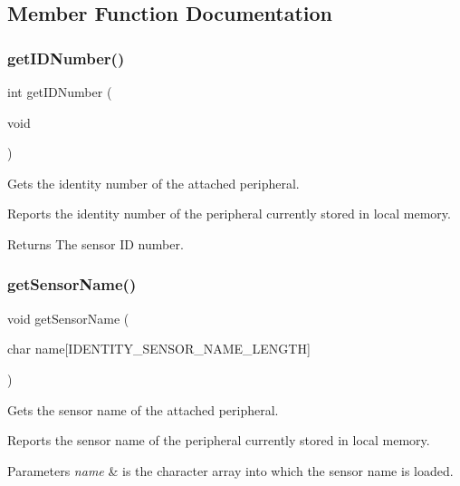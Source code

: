 \subsection{Member Function Documentation}
\mbox{\label{class_identifiable_a85d8439d79bd15eeb1c40d694d3d49ae}} 
\subsubsection{\texorpdfstring{getIDNumber()}{getIDNumber()}}
{\footnotesize\ttfamily int get\+I\+D\+Number (\begin{DoxyParamCaption}\item[{void}]{ }\end{DoxyParamCaption})}



Gets the identity number of the attached peripheral. 

Reports the identity number of the peripheral currently stored in local memory. \begin{DoxyReturn}{Returns}
The sensor ID number. 
\end{DoxyReturn}
\mbox{\label{class_identifiable_a7942e337c1303ce42cc822032465c66a}} 
\subsubsection{\texorpdfstring{getSensorName()}{getSensorName()}}
{\footnotesize\ttfamily void get\+Sensor\+Name (\begin{DoxyParamCaption}\item[{char}]{name\mbox{[}\+I\+D\+E\+N\+T\+I\+T\+Y\+\_\+\+S\+E\+N\+S\+O\+R\+\_\+\+N\+A\+M\+E\+\_\+\+L\+E\+N\+G\+T\+H\mbox{]} }\end{DoxyParamCaption})}



Gets the sensor name of the attached peripheral. 

Reports the sensor name of the peripheral currently stored in local memory. 
\begin{DoxyParams}{Parameters}
{\em name} & is the character array into which the sensor name is loaded. \\
\hline
\end{DoxyParams}
\mbox{\label{class_identifiable_adbc1a3f62e543a0df002a43413998a26}} 
